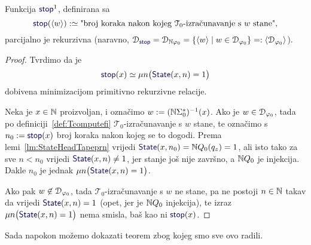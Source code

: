 \begin{lema}[{name=[parcijalna rekurzivnost brojenja koraka do zaustavljanja]}]\label{lm:stopprek}
Funkcija $\f{stop}^1$, definirana sa
\begin{equation}
    \f{stop}(\kr w):\simeq\text{"broj koraka nakon kojeg $\mathcal T_0$-izračunavanje s $w$ stane",}
\end{equation}
    parcijalno je rekurzivna (naravno, $\dom{\f{stop}}=\dom{\N\varphi_0}=\{\kr w\mid w\in\dom{\varphi_0}\}=:\kr{\dom{\varphi_0}}$).
\end{lema}
\begin{proof}
Tvrdimo da je
\begin{equation}\label{eq:stopdef}
    \f{stop}(x)\simeq\mu n\bigl(\f{State}(x,n)=1\bigr)
\end{equation}
dobivena minimizacijom primitivno rekurzivne relacije.

Neka je $x\in{\mathbb N}$ proizvoljan, i označimo $w:=({\mathbb N}\Sigma_0^*)^{-1}(x)$. Ako je $w\in\mathcal D_{\varphi_0}$, tada po definiciji~\ref{def:Tcomputefi} $\mathcal T_0$-izračunavanje s $w$ stane, te označimo s $n_0:=\f{stop}(x)$ broj koraka nakon kojeg se to dogodi.
Prema lemi~\ref{lm:StateHeadTapeprn} vrijedi $\f{State}(x,n_0)=\N Q_0(q_z)=1$, ali isto tako za sve $n<n_0$ vrijedi $\f{State}(x,n)\not=1$, jer stanje još nije završno, a ${\mathbb N} Q_0$ je injekcija. Dakle $n_0$ je jednak $\mu n\bigl(\f{State}(x,n)=1\bigr)$.

Ako pak $w\not\in\mathcal D_{\varphi_0}$, tada $\mathcal T_0$-izračunavanje s $w$ ne stane, pa ne postoji $n\in{\mathbb N}$ takav da vrijedi $\f{State}(x,n)=1$ (opet, jer je ${\mathbb N} Q_0$ injekcija), te izraz $\mu n\bigl(\f{State}(x,n)=1\bigr)$ nema smisla, baš kao ni $\f{stop}(x)$.
\end{proof}

Sada napokon možemo dokazati teorem zbog kojeg smo sve ovo radili.


